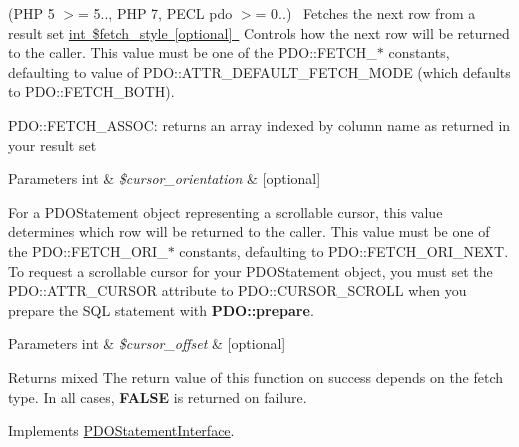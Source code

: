 (P\+HP 5 $>$= 5.., P\+HP 7, P\+E\+CL pdo $>$= 0..)~\newline
 Fetches the next row from a result set \mbox{\hyperlink{}{int \$fetch\+\_\+style \mbox{[}optional\mbox{]} }} Controls how the next row will be returned to the caller. This value must be one of the P\+D\+O\+::\+F\+E\+T\+C\+H\+\_\+$\ast$ constants, defaulting to value of P\+D\+O\+::\+A\+T\+T\+R\+\_\+\+D\+E\+F\+A\+U\+L\+T\+\_\+\+F\+E\+T\+C\+H\+\_\+\+M\+O\+DE (which defaults to P\+D\+O\+::\+F\+E\+T\+C\+H\+\_\+\+B\+O\+TH). 

P\+D\+O\+::\+F\+E\+T\+C\+H\+\_\+\+A\+S\+S\+OC\+: returns an array indexed by column name as returned in your result set 


\begin{DoxyParams}[1]{Parameters}
int & {\em \$cursor\+\_\+orientation} & \mbox{[}optional\mbox{]} \\
\hline
\end{DoxyParams}
For a P\+D\+O\+Statement object representing a scrollable cursor, this value determines which row will be returned to the caller. This value must be one of the P\+D\+O\+::\+F\+E\+T\+C\+H\+\_\+\+O\+R\+I\+\_\+$\ast$ constants, defaulting to P\+D\+O\+::\+F\+E\+T\+C\+H\+\_\+\+O\+R\+I\+\_\+\+N\+E\+XT. To request a scrollable cursor for your P\+D\+O\+Statement object, you must set the P\+D\+O\+::\+A\+T\+T\+R\+\_\+\+C\+U\+R\+S\+OR attribute to P\+D\+O\+::\+C\+U\+R\+S\+O\+R\+\_\+\+S\+C\+R\+O\+LL when you prepare the S\+QL statement with {\bfseries P\+D\+O\+::prepare}. 


\begin{DoxyParams}[1]{Parameters}
int & {\em \$cursor\+\_\+offset} & \mbox{[}optional\mbox{]} \\
\hline
\end{DoxyParams}
\begin{DoxyReturn}{Returns}
mixed The return value of this function on success depends on the fetch type. In all cases, {\bfseries F\+A\+L\+SE} is returned on failure. 
\end{DoxyReturn}


Implements \mbox{\hyperlink{interface_pes_1_1_database_1_1_statement_1_1_p_d_o_statement_interface_a442adc7aeb1b6d8f275aa93a700d7cac}{P\+D\+O\+Statement\+Interface}}.

\mbox{\label{class_pes_1_1_database_1_1_statement_1_1_statement_ace36703cecd9de1814b68fc8d0e69c73}} 
